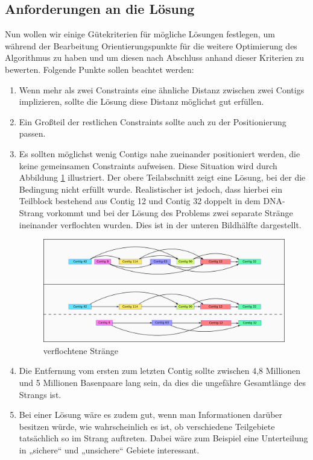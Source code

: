 \subsection{Anforderungen an die Lösung}
Nun wollen wir einige Gütekriterien für mögliche Lösungen festlegen, um während der Bearbeitung Orientierungspunkte für die weitere Optimierung des Algorithmus zu haben und um diesen nach Abschluss anhand dieser Kriterien zu bewerten.
Folgende Punkte sollen beachtet werden:
\begin{enumerate}
\item Wenn mehr als zwei Constraints eine ähnliche Distanz zwischen zwei Contigs 
implizieren, sollte die Lösung diese Distanz möglichst gut erfüllen.
\item Ein Großteil der restlichen Constraints sollte auch zu der Positionierung passen.
\item Es sollten möglichst wenig Contigs nahe zueinander positioniert werden, die keine gemeinsamen Constraints aufweisen. Diese Situation wird durch Abbildung \ref{gespallten} illustriert. Der obere Teilabschnitt zeigt eine Lösung, bei der die Bedingung nicht erfüllt wurde. Realistischer ist jedoch, dass hierbei ein Teilblock bestehend aus Contig 12 und Contig 32 doppelt in dem DNA-Strang vorkommt und bei der Lösung des Problems zwei separate Stränge ineinander verflochten wurden. Dies ist in der unteren Bildhälfte dargestellt.

\begin{figure}
	\begin{center}
		\includegraphics[width=1\textwidth]{bilder/gespallten}
	\end{center}
	\caption{verflochtene Stränge}
	\label{gespallten}
\end{figure}
	
\item Die Entfernung vom ersten zum letzten Contig sollte zwischen 4,8 Millionen und 5 Millionen Basenpaare lang sein, da dies die ungefähre Gesamtlänge des Strangs ist.
\item Bei einer Lösung wäre es zudem gut, wenn man Informationen darüber besitzen würde, wie wahrscheinlich es ist, ob verschiedene Teilgebiete tatsächlich so im Strang auftreten. Dabei wäre zum Beispiel eine Unterteilung in „sichere“ und „unsichere“ Gebiete interessant.
\end{enumerate}

